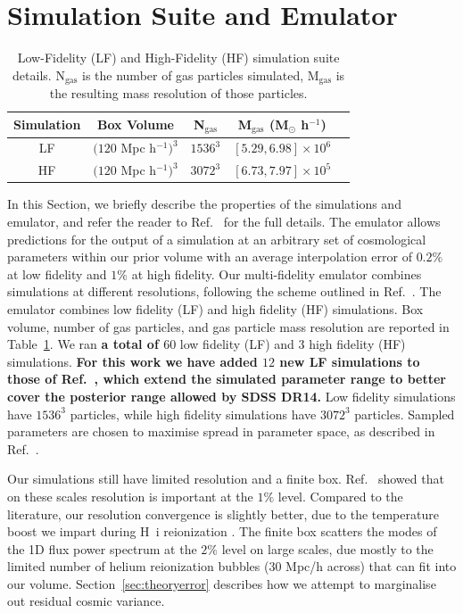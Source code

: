 \section{Simulation Suite and Emulator}
\label{sec:emulator}
\label{sec:simulations}

\begin{table}
	\centering
     \begin{tabular}{|c|c|c|c|c|}
		\hline
		Simulation & Box Volume & N$_{\text{gas}}$ & M$_{\text{gas}}$ (M$_{\odot}$ h$^{-1}$)\\
		\hline
		LF & $(120$ Mpc h$^{-1})^3$ & $1536^3$ & $[5.29, 6.98]\times10^6$\\
		HF & $(120$ Mpc h$^{-1})^3$ & $3072^3$ & $[6.73, 7.97]\times10^5$\\
		\hline
	\end{tabular}
    \caption{\label{table:simulations}
    Low-Fidelity (LF) and High-Fidelity (HF) simulation suite details.
    N$_{\text{gas}}$ is the number of gas particles simulated, M$_{\text{gas}}$ is the resulting mass resolution of those particles.}
\end{table}

In this Section, we briefly describe the properties of the simulations and emulator, and refer the reader to Ref.~\cite{2023simsuite} for the full details.
The emulator allows predictions for the output of a simulation at an arbitrary set of cosmological parameters within our prior volume with an average interpolation error of $0.2\%$ at low fidelity and $1\%$ at high fidelity.
Our multi-fidelity emulator combines simulations at different resolutions, following the scheme outlined in Ref.~\cite{2022MNRAS.517.3200F}.
The emulator combines low fidelity (LF) and high fidelity (HF) simulations.
Box volume, number of gas particles, and gas particle mass resolution are reported in Table~\ref{table:simulations}.
We ran \textbf{a total of $60$} low fidelity (LF) and $3$ high fidelity (HF) simulations. \textbf{For this work we have added $12$ new LF simulations to those of Ref.~\cite{2023simsuite}, which extend the simulated parameter range to better cover the posterior range allowed by SDSS DR14.}
Low fidelity simulations have $1536^3$ particles, while high fidelity simulations have $3072^3$ particles.
Sampled parameters are chosen to maximise spread in parameter space, as described in Ref.~\cite{2023simsuite}. 

Our simulations still have limited resolution and a finite box. Ref.~\cite{2023simsuite} showed that on these scales resolution is important at the $1\%$ level. Compared to the literature, our resolution convergence is slightly better, due to the temperature boost we impart during H~{\sc i} reionization \cite{2019ApJ...874..154D}. The finite box scatters the modes of the 1D flux power spectrum at the $2\%$ level on large scales, due mostly to the limited number of helium reionization bubbles ($30$ Mpc/h across) that can fit into our volume. Section~\ref{sec:theoryerror} describes how we attempt to marginalise out residual cosmic variance.

